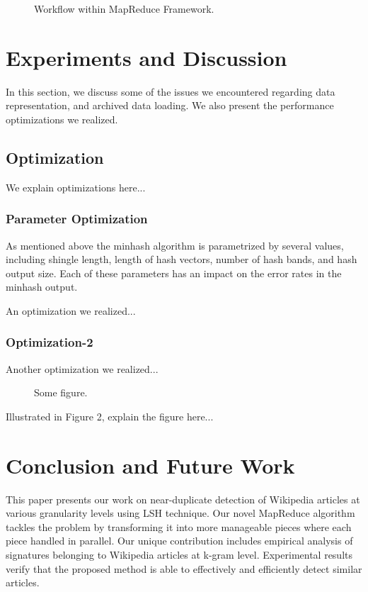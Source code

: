 \documentclass{acm_proc_article-sp}
\begin{document}
\begin{figure}
\centering
{}
\caption{Workflow within MapReduce Framework.}
\end{figure}

\section{Experiments and Discussion}
In this section, we discuss some of the issues we encountered regarding data representation, and archived data loading. We also present the performance optimizations we realized.

\subsection{Optimization}

We explain optimizations here...

\subsubsection{Parameter Optimization}

As mentioned above the minhash algorithm is parametrized by several values, including shingle length, length of hash vectors, number of hash bands, and hash output size. Each of these parameters has an impact on the error rates in the minhash output. 


An optimization we realized...

\subsubsection{Optimization-2}
Another optimization we realized...

\begin{figure*}
\centering
{}
\caption{Some figure.}
\end{figure*}

Illustrated in Figure 2, explain the figure here...

\section{Conclusion and Future Work}
This paper presents our work on near-duplicate detection of Wikipedia articles at various granularity levels using LSH technique. Our novel MapReduce algorithm tackles the problem by transforming it into more manageable pieces where each piece handled in parallel. Our unique contribution includes empirical analysis of signatures belonging to Wikipedia articles at k-gram level. Experimental results verify that the proposed method is able to effectively and efficiently detect similar articles.
\end{document}
